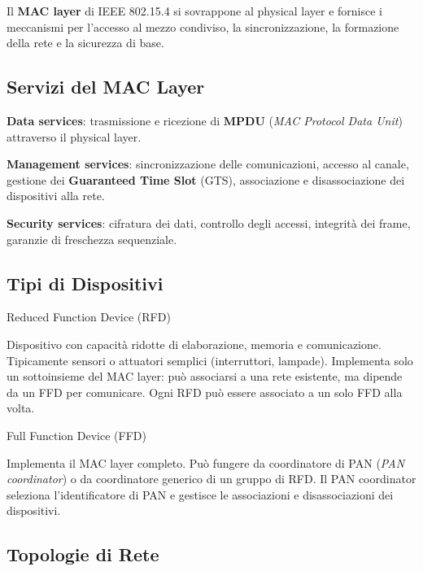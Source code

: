 \documentclass[
  italian,
  openany]{book}
\begin{document}
Il \textbf{MAC layer} di IEEE 802.15.4 si sovrappone al physical layer e
fornisce i meccanismi per l'accesso al mezzo condiviso, la
sincronizzazione, la formazione della rete e la sicurezza di base.

\subsection{Servizi del MAC Layer}\label{servizi-del-mac-layer}

\textbf{Data services}: trasmissione e ricezione di \textbf{MPDU}
(\emph{MAC Protocol Data Unit}) attraverso il physical layer.

\textbf{Management services}: sincronizzazione delle comunicazioni,
accesso al canale, gestione dei \textbf{Guaranteed Time Slot} (GTS),
associazione e disassociazione dei dispositivi alla rete.

\textbf{Security services}: cifratura dei dati, controllo degli accessi,
integrità dei frame, garanzie di freschezza sequenziale.

\subsection{Tipi di Dispositivi}\label{tipi-di-dispositivi}

\begin{calloutdefinition}{Reduced Function Device (RFD)}

Dispositivo con capacità ridotte di elaborazione, memoria e
comunicazione. Tipicamente sensori o attuatori semplici (interruttori,
lampade). Implementa solo un sottoinsieme del MAC layer: può associarsi
a una rete esistente, ma dipende da un FFD per comunicare. Ogni RFD può
essere associato a un solo FFD alla volta.

\end{calloutdefinition}

\begin{calloutdefinition}{Full Function Device (FFD)}

Implementa il MAC layer completo. Può fungere da coordinatore di PAN
(\emph{PAN coordinator}) o da coordinatore generico di un gruppo di RFD.
Il PAN coordinator seleziona l'identificatore di PAN e gestisce le
associazioni e disassociazioni dei dispositivi.

\end{calloutdefinition}

\subsection{Topologie di Rete}\label{topologie-di-rete}
\end{document}
